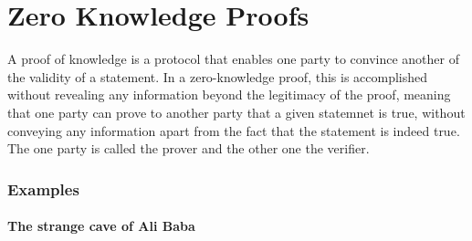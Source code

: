 \chapter{Zero Knowledge Proofs}
\label{zkp}

A proof of knowledge is a protocol that enables one party to convince another of the validity of a statement.
In a zero-knowledge proof, this is accomplished without revealing any information beyond the legitimacy of the proof\cite{kiagias:crypto},
meaning that one party can prove to another party that a given statemnet is true, without conveying any information apart from
the fact that the statement is indeed true\cite{wiki:zkp}. The one party is called the prover and the other one the verifier.

\subsection{Examples}

\begin{figure*}[t!]
  \centering
\end{figure*}

\subsubsection{The strange cave of Ali Baba}

